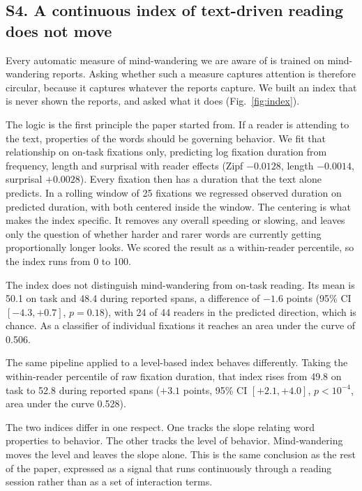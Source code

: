 \documentclass[11pt]{article}
\begin{document}
\subsection*{S4. A continuous index of text-driven reading does not move}

Every automatic measure of mind-wandering we are aware of is trained on mind-wandering reports.
Asking whether such a measure captures attention is therefore circular, because it captures
whatever the reports capture. We built an index that is never shown the reports, and asked what
it does (Fig.~\ref{fig:index}).

The logic is the first principle the paper started from. If a reader is attending to the text,
properties of the words should be governing behavior. We fit that relationship on on-task
fixations only, predicting log fixation duration from frequency, length and surprisal with
reader effects (Zipf $-0.0128$, length $-0.0014$, surprisal $+0.0028$). Every fixation then has
a duration that the text alone predicts. In a rolling window of 25 fixations we regressed
observed duration on predicted duration, with both centered inside the window. The centering is
what makes the index specific. It removes any overall speeding or slowing, and leaves only the
question of whether harder and rarer words are currently getting proportionally longer looks.
We scored the result as a within-reader percentile, so the index runs from 0 to 100.

The index does not distinguish mind-wandering from on-task reading. Its mean is 50.1 on task and
48.4 during reported spans, a difference of $-1.6$ points (95\% CI $[-4.3, +0.7]$, $p=0.18$),
with 24 of 44 readers in the predicted direction, which is chance. As a classifier of individual
fixations it reaches an area under the curve of 0.506.

The same pipeline applied to a level-based index behaves differently. Taking the within-reader
percentile of raw fixation duration, that index rises from 49.8 on task to 52.8 during reported
spans ($+3.1$ points, 95\% CI $[+2.1, +4.0]$, $p<10^{-4}$, area under the curve 0.528).

The two indices differ in one respect. One tracks the slope relating word properties to
behavior. The other tracks the level of behavior. Mind-wandering moves the level and leaves
the slope alone. This is the same conclusion as the rest of the paper, expressed as a signal
that runs continuously through a reading session rather than as a set of interaction terms.
\end{document}
